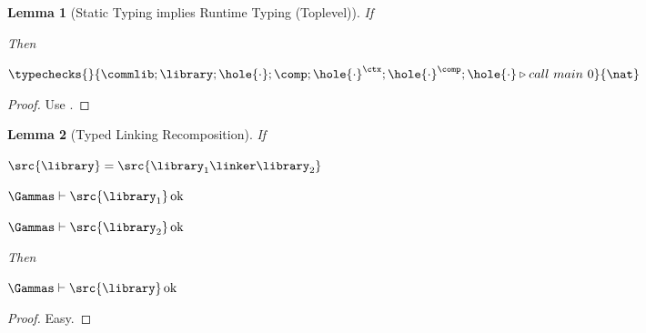 \documentclass[a4paper,names,dvipsnames]{article}
\newtheorem{lemma}{Lemma}
\begin{document}
\begin{lemma}[Static Typing implies Runtime Typing (Toplevel)]\label{lem:static-implies-runtime:toplevel}
  If
  Then
  \begin{goals}
    \item $\typechecks{}{\commlib;\library;\hole{\cdot};\comp;\hole{\cdot}^{\ctx};\hole{\cdot}^{\comp};\hole{\cdot}\triangleright call\ main\ 0}{\nat}$
  \end{goals}
\end{lemma}
\begin{proof}
  Use .
\end{proof}

\begin{lemma}[Typed Linking Recomposition]\label{lem:typed:linking:recomposition}
  If
  \begin{assumptions}
    \item $\src{\library} = \src{\library_{1}\linker\library_{2}}$
    \item $\Gammas\vdash\src{\library_{1}}\operatorname{ok}$
    \item $\Gammas\vdash\src{\library_{2}}\operatorname{ok}$
  \end{assumptions}
  Then
  \begin{goals}
    \item $\Gammas\vdash\src{\library}\operatorname{ok}$
  \end{goals}
\end{lemma}
\begin{proof}
  Easy.
\end{proof}
\end{document}
